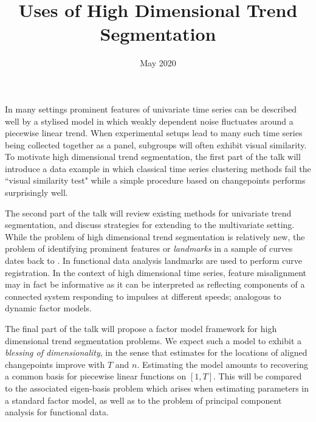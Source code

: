 \documentclass{article}
\title{Uses of High Dimensional Trend Segmentation}
\date{May 2020}
\begin{document}
\maketitle

In many settings prominent features of univariate time series can be described  well  by a stylised model in which weakly dependent noise fluctuates around a piecewise linear trend. When experimental setups lead to many such time series being collected together as a panel, subgroups will often exhibit visual similarity. To motivate high dimensional trend segmentation, the first part of the talk will introduce a data example in which classical time series clustering methods fail the ``visual similarity test" while a simple procedure based on changepoints performs surprisingly well.

The second part of the talk will review existing methods for univariate trend segmentation, and discuss strategies for extending to the multivariate setting. While the problem of high dimensional trend segmentation is relatively new, the problem of identifying prominent features or \textit{landmarks} in a sample of curves dates back to  \cite{kneip1992statistical}. In functional data analysis landmarks are used to perform curve registration. In the context of high dimensional time series, feature misalignment may in fact be informative as it can be interpreted as reflecting  components of a connected system responding to impulses at different speeds; analogous to dynamic factor models. 

The final part of the talk will propose a factor model framework for high dimensional trend segmentation problems. We expect such a model to exhibit a \textit{blessing of dimensionality}, in the sense that estimates for the locations of aligned changepoints improve with $T$ and $n$. Estimating the model amounts to recovering a common basis for piecewise linear functions on $[1,T]$. This will be compared to the associated eigen-basis problem which arises when estimating parameters in a standard factor model, as well as to the problem of principal component analysis for functional data. 

\newpage


\end{document}
